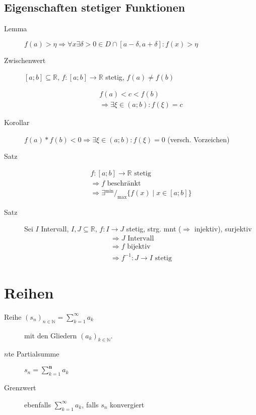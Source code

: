 \subsection{Eigenschaften stetiger Funktionen}

\begin{description}
  \item[Lemma] $f(a) > \eta \Rightarrow \forall x \exists \delta > 0 \in D \cap [a - \delta, a + \delta]: f(x) > \eta$
  \item[Zwischenwert]
    $[a; b] \subseteq \mathbb{R}$, $f: [a; b] \rightarrow \mathbb{R}$ stetig, $f(a) \neq f(b)$

    \begin{gather*}
      f(a) < c < f(b) \\
      \Rightarrow \exists \xi \in (a; b): f(\xi) = c
    \end{gather*}

  \item [Korollar] $f(a) * f(b) < 0 \Rightarrow \exists \xi \in (a; b): f(\xi) = 0$
        (versch. Vorzeichen)

  \item [Satz]
        \begin{gather*}
          f: [a; b] \rightarrow \mathbb{R} \text{ stetig} \\
          \Rightarrow f \text{ beschränkt} \\
          \Rightarrow \exists {}^{\min}/_{\max} \{ f(x) \mid x \in [a; b] \}
        \end{gather*}

  \item [Satz] Sei $I$ Intervall, $I, J \subseteq \mathbb{R}$, $f: I \rightarrow J$ stetig, strg. mnt ($\Rightarrow$ injektiv), surjektiv
        \begin{gather*}
          \Rightarrow J \text{ Intervall} \\
          \Rightarrow f \text{ bijektiv} \\
          \Rightarrow f^{-1}: J \rightarrow I \text{ stetig}
        \end{gather*}
\end{description}

\section{Reihen}

\begin{description}
  \item [Reihe $(s_n)_{n \in \mathbb{N}} = \sum_{k=1}^\infty a_k$]
        mit den Gliedern $(a_k)_{k \in \mathbb{N}}$.

  \item [$n$te Partialsumme]
        $s_n = \sum_{k=1}^{\mathbf{n}} a_k$

  \item [Grenzwert] ebenfalls $\sum_{k=1}^{\boldsymbol{\infty}} a_k$, falls $s_n$ konvergiert
\end{description}

